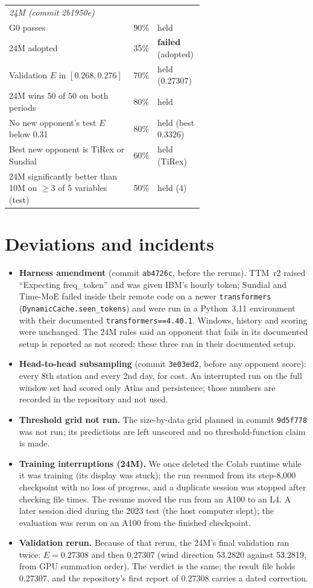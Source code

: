 \documentclass{article}
\begin{document}
\begin{table}[H]
\begin{tabular}{p{0.64\linewidth}rl}
\multicolumn{3}{l}{\emph{24M (commit 2b1950e)}}\\
G0 passes & 90\% & held\\
24M adopted & 35\% & \textbf{failed} (adopted)\\
Validation $E$ in $[0.268,0.276]$ & 70\% & held (0.27307)\\
24M wins 50 of 50 on both periods & 80\% & held\\
No new opponent's test $E$ below 0.31 & 80\% & held (best 0.3326)\\
Best new opponent is TiRex or Sundial & 60\% & held (TiRex)\\
24M significantly better than 10M on $\ge$3 of 5 variables (test) & 50\% & held (4)\\
\bottomrule
\end{tabular}
\end{table}

\section{Deviations and incidents}
\label{app:dev}

\begin{itemize}
\item \textbf{Harness amendment} (commit \texttt{ab4726c}, before the reruns). TTM~r2 raised ``Expecting freq\_token''
and was given IBM's hourly token; Sundial and Time-MoE failed inside their remote code on a newer \texttt{transformers}
(\texttt{DynamicCache.seen\_tokens}) and were run in a Python~3.11 environment with their documented
\texttt{transformers==4.40.1}. Windows, history and scoring were unchanged. The 24M rules said an opponent that fails in
its documented setup is reported as not scored; these three ran in their documented setup.
\item \textbf{Head-to-head subsampling} (commit \texttt{3e03ed2}, before any opponent score): every 8th station and every
2nd day, for cost. An interrupted run on the full window set had scored only Atlas and persistence; those numbers are
recorded in the repository and not used.
\item \textbf{Threshold grid not run.} The size-by-data grid planned in commit \texttt{9d5f778} was not run; its
predictions are left unscored and no threshold-function claim is made.
\item \textbf{Training interruptions (24M).} We once deleted the Colab runtime while it was training (its display was
stuck); the run resumed from its step-8,000 checkpoint with no loss of progress, and a duplicate session was stopped
after checking file times. The resume moved the run from an A100 to an L4. A later session died during the 2023 test
(the host computer slept); the evaluation was rerun on an A100 from the finished checkpoint.
\item \textbf{Validation rerun.} Because of that rerun, the 24M's final validation ran twice: $E=0.27308$ and then
$0.27307$ (wind direction 53.2820 against 53.2819, from GPU summation order). The verdict is the same; the result file
holds 0.27307, and the repository's first report of 0.27308 carries a dated correction.
\end{itemize}
\end{document}
